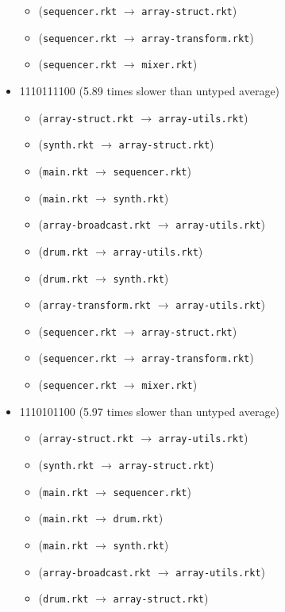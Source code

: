 \documentclass{article}
\newcommand{\mono}[1]{\texttt{#1}}
\begin{document}
\begin{itemize}
\begin{itemize}
  \item (\mono{sequencer.rkt} $\rightarrow$ \mono{array-struct.rkt})
  \item (\mono{sequencer.rkt} $\rightarrow$ \mono{array-transform.rkt})
  \item (\mono{sequencer.rkt} $\rightarrow$ \mono{mixer.rkt})
  \end{itemize}
\item 1110111100 (5.89 times slower than untyped average)
  \begin{itemize}
  \item (\mono{array-struct.rkt} $\rightarrow$ \mono{array-utils.rkt})
  \item (\mono{synth.rkt} $\rightarrow$ \mono{array-struct.rkt})
  \item (\mono{main.rkt} $\rightarrow$ \mono{sequencer.rkt})
  \item (\mono{main.rkt} $\rightarrow$ \mono{synth.rkt})
  \item (\mono{array-broadcast.rkt} $\rightarrow$ \mono{array-utils.rkt})
  \item (\mono{drum.rkt} $\rightarrow$ \mono{array-utils.rkt})
  \item (\mono{drum.rkt} $\rightarrow$ \mono{synth.rkt})
  \item (\mono{array-transform.rkt} $\rightarrow$ \mono{array-utils.rkt})
  \item (\mono{sequencer.rkt} $\rightarrow$ \mono{array-struct.rkt})
  \item (\mono{sequencer.rkt} $\rightarrow$ \mono{array-transform.rkt})
  \item (\mono{sequencer.rkt} $\rightarrow$ \mono{mixer.rkt})
  \end{itemize}
\item 1110101100 (5.97 times slower than untyped average)
  \begin{itemize}
  \item (\mono{array-struct.rkt} $\rightarrow$ \mono{array-utils.rkt})
  \item (\mono{synth.rkt} $\rightarrow$ \mono{array-struct.rkt})
  \item (\mono{main.rkt} $\rightarrow$ \mono{sequencer.rkt})
  \item (\mono{main.rkt} $\rightarrow$ \mono{drum.rkt})
  \item (\mono{main.rkt} $\rightarrow$ \mono{synth.rkt})
  \item (\mono{array-broadcast.rkt} $\rightarrow$ \mono{array-utils.rkt})
  \item (\mono{drum.rkt} $\rightarrow$ \mono{array-struct.rkt})

\end{itemize}
\end{itemize}
\end{document}
